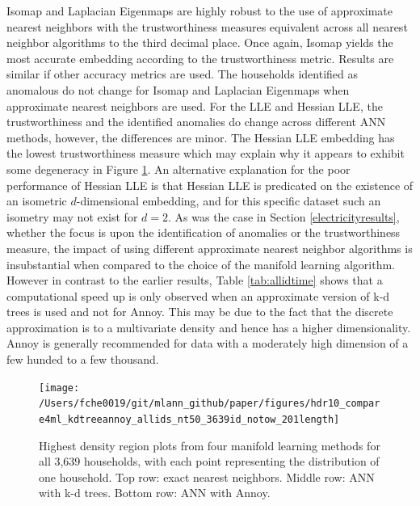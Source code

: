 \documentclass[11pt,a4paper,]{article}
\begin{document}
Isomap and Laplacian Eigenmaps are highly robust to the use of approximate nearest neighbors with the trustworthiness measures equivalent across all nearest neighbor algorithms to the third decimal place. Once again, Isomap yields the most accurate embedding according to the trustworthiness metric. Results are similar if other accuracy metrics are used. The households identified as anomalous do not change for Isomap and Laplacian Eigenmaps when approximate nearest neighbors are used. For the LLE and Hessian LLE, the trustworthiness and the identified anomalies do change across different ANN methods, however, the differences are minor. The Hessian LLE embedding has the lowest trustworthiness measure which may explain why it appears to exhibit some degeneracy in Figure \ref{fig:allidhdr}. An alternative explanation for the poor performance of Hessian LLE is that Hessian LLE is predicated on the existence of an isometric \(d\)-dimensional embedding, and for this specific dataset such an isometry may not exist for \(d=2\). As was the case in Section \ref{electricityresults}, whether the focus is upon the identification of anomalies or the trustworthiness measure, the impact of using different approximate nearest neighbor algorithms is insubstantial when compared to the choice of the manifold learning algorithm. However in contrast to the earlier results, Table \ref{tab:allidtime} shows that a computational speed up is only observed when an approximate version of k-d trees is used and not for Annoy. This may be due to the fact that the discrete approximation is to a multivariate density and hence has a higher dimensionality. Annoy is generally recommended for data with a moderately high dimension of a few hunded to a few thousand.

\begin{figure}

{\centering \texttt{[image: /Users/fche0019/git/mlann\_github/paper/figures/hdr10\_compare4ml\_kdtreeannoy\_allids\_nt50\_3639id\_notow\_201length]} 

}

\caption{Highest density region plots from four manifold learning methods for all 3,639 households, with each point representing the distribution of one household. Top row: exact nearest neighbors. Middle row: ANN with k-d trees. Bottom row: ANN with Annoy.}\label{fig:allidhdr}
\end{figure}
\end{document}
